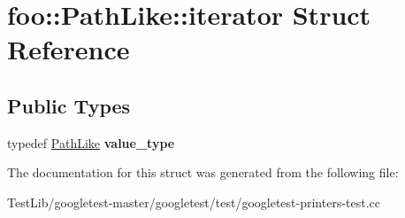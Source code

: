 \hypertarget{structfoo_1_1PathLike_1_1iterator}{}\section{foo\+:\+:Path\+Like\+:\+:iterator Struct Reference}
\label{structfoo_1_1PathLike_1_1iterator}
\subsection*{Public Types}
\begin{DoxyCompactItemize}
\item 
\mbox{\label{structfoo_1_1PathLike_1_1iterator_a797c204878a09e04b23cfe6b48ac7016}} 
typedef \hyperlink{classfoo_1_1PathLike}{Path\+Like} {\bfseries value\+\_\+type}
\end{DoxyCompactItemize}


The documentation for this struct was generated from the following file\+:\begin{DoxyCompactItemize}
\item 
Test\+Lib/googletest-\/master/googletest/test/googletest-\/printers-\/test.\+cc\end{DoxyCompactItemize}
